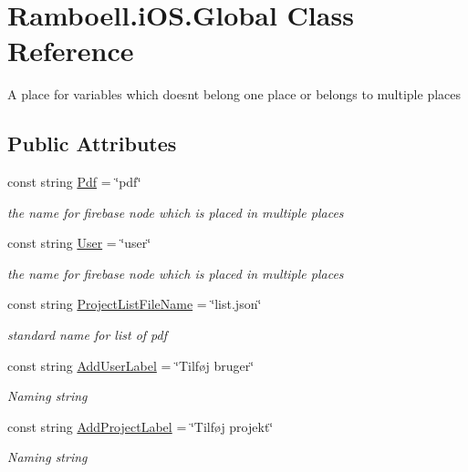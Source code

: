 \hypertarget{class_ramboell_1_1i_o_s_1_1_global}{}\section{Ramboell.\+i\+O\+S.\+Global Class Reference}
\label{class_ramboell_1_1i_o_s_1_1_global}


A place for variables which doesn\textquotesingle{}t belong one place or belongs to multiple places  


\subsection*{Public Attributes}
\begin{DoxyCompactItemize}
\item 
const string \hyperlink{class_ramboell_1_1i_o_s_1_1_global_ae8d76d3d2a5f72b0c37386a8976dbc34}{Pdf} = \char`\"{}pdf\char`\"{}
\begin{DoxyCompactList}\small\item\em the name for firebase node which is placed in multiple places \end{DoxyCompactList}\item 
const string \hyperlink{class_ramboell_1_1i_o_s_1_1_global_a30a6ccae88af77bbaacd121b7c707a73}{User} = \char`\"{}user\char`\"{}
\begin{DoxyCompactList}\small\item\em the name for firebase node which is placed in multiple places \end{DoxyCompactList}\item 
const string \hyperlink{class_ramboell_1_1i_o_s_1_1_global_a23d8cd28e3aa412d459934cd1ec82a74}{Project\+List\+File\+Name} = \char`\"{}list.\+json\char`\"{}
\begin{DoxyCompactList}\small\item\em standard name for list of pdf \end{DoxyCompactList}\item 
const string \hyperlink{class_ramboell_1_1i_o_s_1_1_global_a09c22c3d3e5af72fa96fde5f5a2a3fef}{Add\+User\+Label} = \char`\"{}Tilføj bruger\char`\"{}
\begin{DoxyCompactList}\small\item\em Naming string \end{DoxyCompactList}\item 
const string \hyperlink{class_ramboell_1_1i_o_s_1_1_global_a426db0fd3d089804ea567d6024b29167}{Add\+Project\+Label} = \char`\"{}Tilføj projekt\char`\"{}
\begin{DoxyCompactList}\small\item\em Naming string \end{DoxyCompactList}\end{DoxyCompactItemize}
